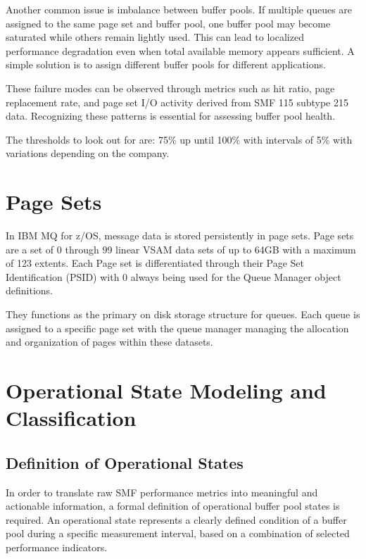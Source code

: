 Another common issue is imbalance between buffer pools. If multiple queues are assigned to the same page set and buffer pool, one buffer pool may become saturated while others remain lightly used. This can lead to localized performance degradation even when total available memory appears sufficient. A simple solution is to assign different buffer pools for different applications. 

These failure modes can be observed through metrics such as hit ratio, page replacement rate, and page set I/O activity derived from SMF 115 subtype 215 data. Recognizing these patterns is essential for assessing buffer pool health.  

The thresholds to look out for are: 75\% up until 100\% with intervals of 5\% with variations depending on the company. 

\autocite{ibm2020_mq_smf_intro}
\autocite{Paice2020}

\section{Page Sets}%
\label{subsec:page-sets}

In IBM MQ for z/OS, message data is stored persistently in page sets. Page sets are a set of 0 through 99 linear VSAM data sets of up to 64GB with a maximum of 123 extents. Each Page set is differentiated through their Page Set Identification (PSID) with 0 always being used for the Queue Manager object definitions. 

They functions as the primary on disk storage structure for queues. Each queue is assigned to a specific page set with the queue manager managing the allocation and organization of pages within these datasets. \autocite{ibm2025_mq_ps}


\section{Operational State Modeling and Classification}%
\label{sec:state-modeling}


\subsection{Definition of Operational States}%
\label{subsec:operational-states}

In order to translate raw SMF performance metrics into meaningful and actionable information, a formal definition of operational buffer pool states is required. An operational state represents a clearly defined condition of a buffer pool during a specific measurement interval, based on a combination of selected performance indicators.

